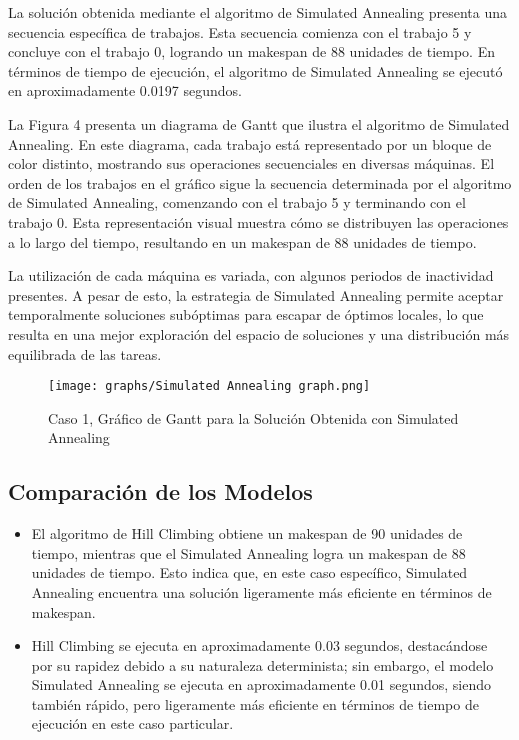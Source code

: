 \documentclass[11pt]{article}
\begin{document}
\noindent La solución obtenida mediante el algoritmo de Simulated Annealing presenta una secuencia específica de trabajos. Esta secuencia comienza con el trabajo 5 y concluye con el trabajo 0, logrando un makespan de 88 unidades de tiempo. En términos de tiempo de ejecución, el algoritmo de Simulated Annealing se ejecutó en aproximadamente 0.0197 segundos.

\vspace{1em} %
\noindent La Figura 4 presenta un diagrama de Gantt que ilustra el algoritmo de Simulated Annealing. En este diagrama, cada trabajo está representado por un bloque de color distinto, mostrando sus operaciones secuenciales en diversas máquinas. El orden de los trabajos en el gráfico sigue la secuencia determinada por el algoritmo de Simulated Annealing, comenzando con el trabajo 5 y terminando con el trabajo 0. Esta representación visual muestra cómo se distribuyen las operaciones a lo largo del tiempo, resultando en un makespan de 88 unidades de tiempo.

\noindent La utilización de cada máquina es variada, con algunos periodos de inactividad presentes. A pesar de esto, la estrategia de Simulated Annealing permite aceptar temporalmente soluciones subóptimas para escapar de óptimos locales, lo que resulta en una mejor exploración del espacio de soluciones y una distribución más equilibrada de las tareas. 

\begin{figure}[H]
\centering
\texttt{[image: graphs/Simulated Annealing graph.png]}
\caption{Caso 1, Gráfico de Gantt para la Solución Obtenida con Simulated Annealing}
\label{fig:miImagen}
\end{figure}

\subsection{Comparación de los Modelos} 
\begin{itemize}
\item El algoritmo de Hill Climbing obtiene un makespan de 90 unidades de tiempo, mientras que el Simulated Annealing logra un makespan de 88 unidades de tiempo. Esto indica que, en este caso específico, Simulated Annealing encuentra una solución ligeramente más eficiente en términos de makespan.
\item Hill Climbing se ejecuta en aproximadamente 0.03 segundos, destacándose por su rapidez debido a su naturaleza determinista; sin embargo, el modelo Simulated Annealing se ejecuta en aproximadamente 0.01 segundos, siendo también rápido, pero ligeramente más eficiente en términos de tiempo de ejecución en este caso particular.
\end{itemize}
\end{document}
